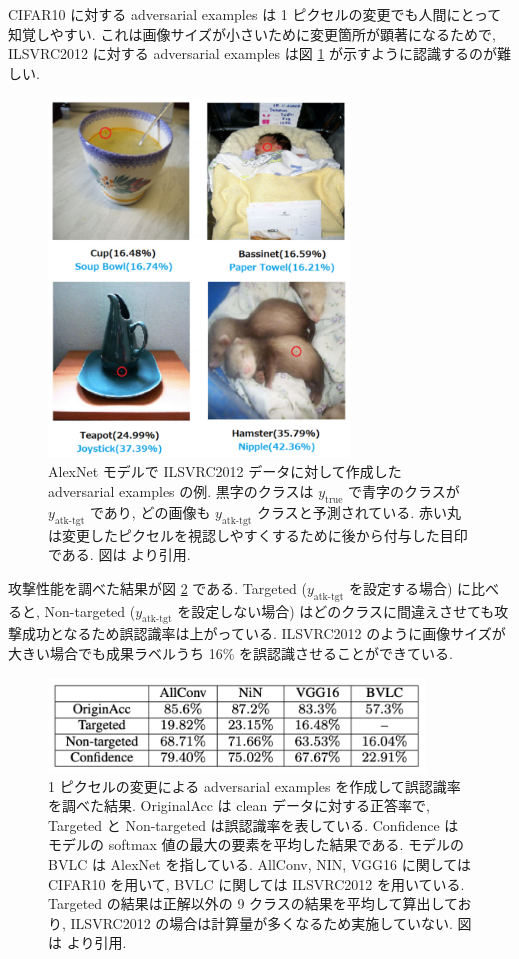 CIFAR10 に対する adversarial examples は 1 ピクセルの変更でも人間にとって知覚しやすい.
これは画像サイズが小さいために変更箇所が顕著になるためで, ILSVRC2012 に対する adversarial examples は図 \ref{fig:one-pixel-imagenet} が示すように認識するのが難しい.
%
\begin{figure}[htbp]
\begin{center}
\includegraphics[width=8.0cm]{figures/one-pixel-imagenet.pdf}
\end{center}
\caption{
AlexNet モデルで ILSVRC2012 データに対して作成した adversarial examples の例.
黒字のクラスは $y_{\text{true}}$ で青字のクラスが $y_{\text{atk-tgt}}$ であり, どの画像も $y_{\text{atk-tgt}}$ クラスと予測されている.
赤い丸は変更したピクセルを視認しやすくするために後から付与した目印である.
図は \cite{su2019one} より引用.
}
\label{fig:one-pixel-imagenet}
\end{figure}
%

攻撃性能を調べた結果が図 \ref{fig:one-pixel-table} である.
Targeted ($y_{\text{atk-tgt}}$ を設定する場合) に比べると, Non-targeted ($y_{\text{atk-tgt}}$ を設定しない場合) はどのクラスに間違えさせても攻撃成功となるため誤認識率は上がっている.
ILSVRC2012 のように画像サイズが大きい場合でも成果ラベルうち 16\% を誤認識させることができている.
%
\begin{figure}[htbp]
\begin{center}
\includegraphics[width=10.0cm]{figures/one-pixel-table.pdf}
\end{center}
\caption{
1 ピクセルの変更による adversarial examples を作成して誤認識率を調べた結果.
OriginalAcc は clean データに対する正答率で, Targeted と Non-targeted は誤認識率を表している.
Confidence はモデルの softmax 値の最大の要素を平均した結果である.
モデルの BVLC は AlexNet を指している.
AllConv, NIN, VGG16 に関しては CIFAR10 を用いて, BVLC に関しては ILSVRC2012 を用いている.
Targeted の結果は正解以外の 9 クラスの結果を平均して算出しており, ILSVRC2012 の場合は計算量が多くなるため実施していない.
図は \cite{su2019one} より引用.
}
\label{fig:one-pixel-table}
\end{figure}
%

